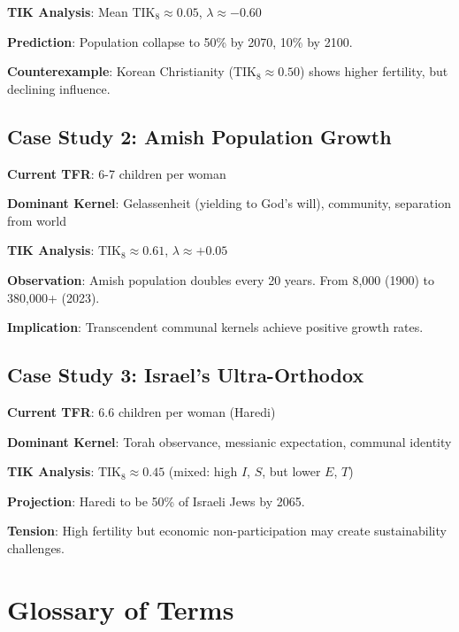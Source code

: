\documentclass[11pt,a4paper]{article}
\theoremstyle{definition}
\theoremstyle{remark}
\newcommand{\TIKeight}{\text{TIK}_8}
\begin{document}
\textbf{TIK Analysis}: Mean $\TIKeight \approx 0.05$, $\lambda \approx -0.60$

\textbf{Prediction}: Population collapse to 50\% by 2070, 10\% by 2100.

\textbf{Counterexample}: Korean Christianity ($\TIKeight \approx 0.50$) shows higher fertility, but declining influence.

\subsection{Case Study 2: Amish Population Growth}

\textbf{Current TFR}: 6-7 children per woman

\textbf{Dominant Kernel}: Gelassenheit (yielding to God's will), community, separation from world

\textbf{TIK Analysis}: $\TIKeight \approx 0.61$, $\lambda \approx +0.05$

\textbf{Observation}: Amish population doubles every 20 years. From 8,000 (1900) to 380,000+ (2023).

\textbf{Implication}: Transcendent communal kernels achieve positive growth rates.

\subsection{Case Study 3: Israel's Ultra-Orthodox}

\textbf{Current TFR}: 6.6 children per woman (Haredi)

\textbf{Dominant Kernel}: Torah observance, messianic expectation, communal identity

\textbf{TIK Analysis}: $\TIKeight \approx 0.45$ (mixed: high $I$, $S$, but lower $E$, $T$)

\textbf{Projection}: Haredi to be 50\% of Israeli Jews by 2065.

\textbf{Tension}: High fertility but economic non-participation may create sustainability challenges.

\section{Glossary of Terms}
\label{app:glossary}
\end{document}
